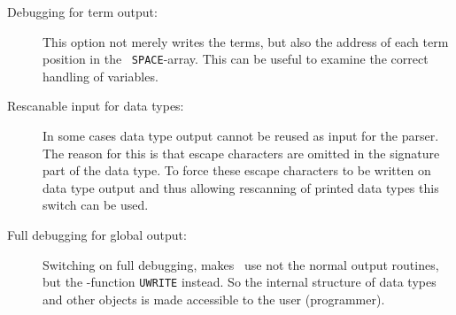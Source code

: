 \begin{description}
\item[Debugging for term output:] This option not merely writes the terms, but also
  the address of each term position in the \ALDES\ {\tt SPACE}-array. This can be
  useful to examine the correct handling of variables.
\item[Rescanable input for data types:] In some cases data type output cannot
  be reused as input for the parser. 
  The reason for this is that escape characters
  are omitted in the signature part of the data type. 
  To force these escape characters
  to be written on data type output and thus allowing rescanning of
  printed data types  this switch can be used.
\item[Full debugging for global output:]
  Switching on full debugging, makes \redux\  use not the normal output
  routines, but the \ALDES-function {\tt UWRITE} instead.
  So the internal structure of data types and other objects is made 
  accessible to  the user (programmer).
\end{description}
